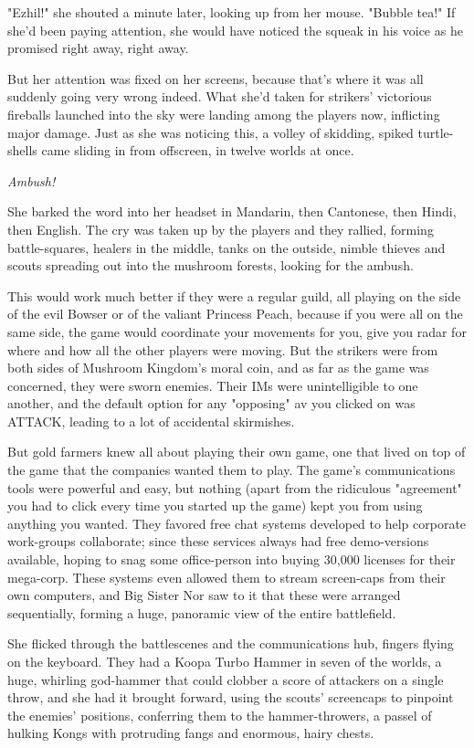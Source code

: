 "Ezhil!" she shouted a minute later, looking up from her mouse.
"Bubble tea!" If she'd been paying attention, she would have
noticed the squeak in his voice as he promised right away, right
away.

But her attention was fixed on her screens, because that's where it
was all suddenly going very wrong indeed. What she'd taken for
strikers' victorious fireballs launched into the sky were landing
among the players now, inflicting major damage. Just as she was
noticing this, a volley of skidding, spiked turtle-shells came
sliding in from offscreen, in twelve worlds at once.

\emph{Ambush!}

She barked the word into her headset in Mandarin, then Cantonese,
then Hindi, then English. The cry was taken up by the players and
they rallied, forming battle-squares, healers in the middle, tanks
on the outside, nimble thieves and scouts spreading out into the
mushroom forests, looking for the ambush.

This would work much better if they were a regular guild, all
playing on the side of the evil Bowser or of the valiant Princess
Peach, because if you were all on the same side, the game would
coordinate your movements for you, give you radar for where and how
all the other players were moving. But the strikers were from both
sides of Mushroom Kingdom's moral coin, and as far as the game was
concerned, they were sworn enemies. Their IMs were unintelligible
to one another, and the default option for any "opposing" av you
clicked on was ATTACK, leading to a lot of accidental skirmishes.

But gold farmers knew all about playing their own game, one that
lived on top of the game that the companies wanted them to play.
The game's communications tools were powerful and easy, but nothing
(apart from the ridiculous "agreement" you had to click every time
you started up the game) kept you from using anything you wanted.
They favored free chat systems developed to help corporate
work-groups collaborate; since these services always had free
demo-versions available, hoping to snag some office-person into
buying 30,000 licenses for their mega-corp. These systems even
allowed them to stream screen-caps from their own computers, and
Big Sister Nor saw to it that these were arranged sequentially,
forming a huge, panoramic view of the entire battlefield.

She flicked through the battlescenes and the communications hub,
fingers flying on the keyboard. They had a Koopa Turbo Hammer in
seven of the worlds, a huge, whirling god-hammer that could clobber
a score of attackers on a single throw, and she had it brought
forward, using the scouts' screencaps to pinpoint the enemies'
positions, conferring them to the hammer-throwers, a passel of
hulking Kongs with protruding fangs and enormous, hairy chests.

